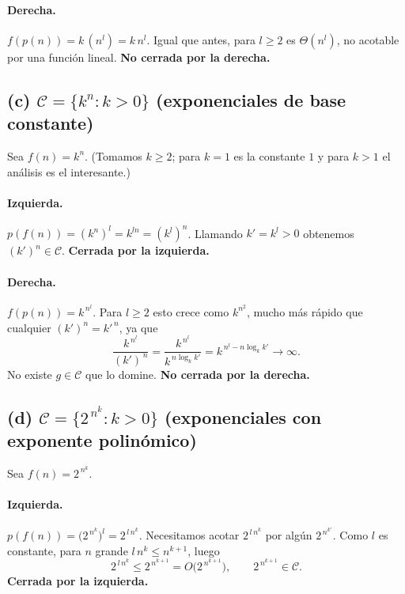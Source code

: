 \documentclass[11pt,a4paper]{article}
\theoremstyle{plain}
\theoremstyle{definition}
\begin{document}
\paragraph{Derecha.} $f(p(n)) = k\,(n^{l}) = k\,n^{l}$. Igual que antes, para
$l\geq 2$ es $\Theta(n^{l})$, no acotable por una funci\'on lineal. \textbf{No
cerrada por la derecha.}

\medskip\noindent{}

\subsection*{(c) $\mathcal{C}=\{k^{n}: k>0\}$ (exponenciales de base constante)}

Sea $f(n)=k^{n}$. (Tomamos $k\geq 2$; para $k=1$ es la constante $1$ y para $k>1$ el
an\'alisis es el interesante.)

\paragraph{Izquierda.} $p(f(n)) = (k^{n})^{l} = k^{ln} = (k^{l})^{n}$. Llamando
$k'=k^{l}>0$ obtenemos $(k')^{n}\in\mathcal{C}$. \textbf{Cerrada por la izquierda.}

\paragraph{Derecha.} $f(p(n)) = k^{\,n^{l}}$. Para $l\geq 2$ esto crece como
$k^{n^{2}}$, mucho m\'as r\'apido que cualquier $(k')^{n}=k'^{\,n}$, ya que
\[
\frac{k^{\,n^{l}}}{(k')^{\,n}} = \frac{k^{\,n^{l}}}{k^{\,n\log_k k'}}
= k^{\,n^{l}-n\log_k k'}\longrightarrow\infty.
\]
No existe $g\in\mathcal{C}$ que lo domine. \textbf{No cerrada por la derecha.}

\medskip\noindent{}

\subsection*{(d) $\mathcal{C}=\{2^{\,n^{k}}: k>0\}$ (exponenciales con exponente polin\'omico)}

Sea $f(n)=2^{\,n^{k}}$.

\paragraph{Izquierda.} $p(f(n)) = \big(2^{\,n^{k}}\big)^{l} = 2^{\,l\,n^{k}}$.
Necesitamos acotar $2^{\,l\,n^{k}}$ por alg\'un $2^{\,n^{k'}}$. Como $l$ es
constante, para $n$ grande $l\,n^{k}\leq n^{k+1}$, luego
\[
2^{\,l\,n^{k}} \leq 2^{\,n^{k+1}} = O\!\big(2^{\,n^{k+1}}\big),\qquad
2^{\,n^{k+1}}\in\mathcal{C}.
\]
\textbf{Cerrada por la izquierda.}
\end{document}
